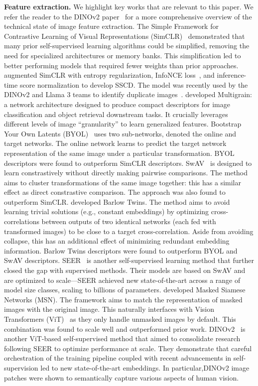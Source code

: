 \documentclass[12pt]{article}
\begin{document}
\textbf{Feature extraction.}
We highlight key works that are relevant to this paper. 
We refer the reader to the DINOv2 paper~\citep{oquab2023dinov2} for a more comprehensive overview of the technical state of image feature extraction.
The Simple Framework for Contrastive Learning of Visual Representations (SimCLR)~\citep{chen2020simple} demonstrated that many prior self-supervised learning algorithms could be simplified, removing the need for specialized architectures or memory banks.
This simplification led to better performing models that required fewer weights than prior approaches.
\citet{pizzi2022self} augmented SimCLR with entropy regularization, InfoNCE loss~\citep{oord2018representation}, and inference-time score normalization to develop SSCD.
The model was recently used by the DINOv2 and Llama 3 teams to identify duplicate images~\citep{oquab2023dinov2,dubey2024llama}.
\citet{berman2019multigrain} developed Multigrain: a network architecture designed to produce compact descriptors for image classification and object retrieval downstream tasks.
It crucially leverages different levels of image ``granularity'' to learn generalized features.
Bootstrap Your Own Latents (BYOL)~\citep{grill2020bootstrap} uses two sub-networks, denoted the online and target networks.
The online network learns to predict the target network representation of the same image under a particular transformation.
BYOL descriptors were found to outperform SimCLR descriptors.
SwAV~\citep{caron2020unsupervised} is designed to learn constrastively without directly making pairwise comparisons.
The method aims to cluster transformations of the same image together: this has a similar effect as direct constrastive comparison.
The approach was also found to outperform SimCLR.
\citet{zbontar2021barlow} developed Barlow Twins. 
The method aims to avoid learning trivial solutions (e.g., constant embeddings) by optimizing cross-correlations between outputs of two identical networks (each fed with transformed images) to be close to a target cross-correlation.
Aside from avoiding collapse, this has an additional effect of minimizing redundant embedding information.
Barlow Twins descriptors were found to outperform BYOL and SwAV descriptors.
SEER~\citep{goyal2021self} is another self-supervised learning method that further closed the gap with supervised methods.
Their models are based on SwAV and are optimized to scale---SEER achieved new state-of-the-art across a range of model size classes, scaling to billions of parameters.
\citet{assran2022masked} developed Masked Siamese Networks (MSN).
The framework aims to match the representation of masked images with the original image.
This naturally interfaces with Vision Transformers (ViT)~\citep{alexey2020image} as they only handle unmasked images by default.
This combination was found to scale well and outperformed prior work.
DINOv2~\citep{oquab2023dinov2} is another ViT-based self-supervised method that aimed to consolidate research following SEER to optimize performance at scale.
They demonstrate that careful orchestration of the training pipeline coupled with recent advancements in self-supervision led to new state-of-the-art embeddings.
In particular,DINOv2 image patches were shown to semantically capture various aspects of human vision.
\end{document}
